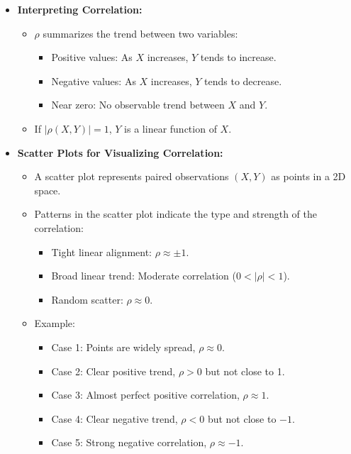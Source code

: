 \documentclass{article}
\begin{document}
\begin{itemize}
  \item \textbf{Interpreting Correlation:}
    \begin{itemize}
      \item $\rho$ summarizes the trend between two variables:
        \begin{itemize}
          \item Positive values: As $X$ increases, $Y$ tends to increase.
          \item Negative values: As $X$ increases, $Y$ tends to decrease.
          \item Near zero: No observable trend between $X$ and $Y$.
        \end{itemize}
      \item If $\lvert \rho(X, Y) \rvert = 1$, $Y$ is a linear function of $X$.
    \end{itemize}

  \item \textbf{Scatter Plots for Visualizing Correlation:}
    \begin{itemize}
      \item A scatter plot represents paired observations $(X, Y)$ as points in a 2D space.
      \item Patterns in the scatter plot indicate the type and strength of the correlation:
        \begin{itemize}
          \item Tight linear alignment: $\rho \approx \pm 1$.
          \item Broad linear trend: Moderate correlation ($0 < \lvert \rho \rvert < 1$).
          \item Random scatter: $\rho \approx 0$.
        \end{itemize}
      \item Example:
        \begin{itemize}
          \item Case 1: Points are widely spread, $\rho \approx 0$.
          \item Case 2: Clear positive trend, $\rho > 0$ but not close to 1.
          \item Case 3: Almost perfect positive correlation, $\rho \approx 1$.
          \item Case 4: Clear negative trend, $\rho < 0$ but not close to $-1$.
          \item Case 5: Strong negative correlation, $\rho \approx -1$.
        \end{itemize}
    \end{itemize}


\end{itemize}
\end{document}
